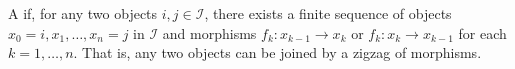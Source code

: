 \begin{definition}
\label{definition:connected_category}
A  if, for any two objects $i, j \in \mathcal{I}$, there exists a finite sequence of objects $x_0 = i, x_1, \dots, x_n = j$ in $\mathcal{I}$ and morphisms $f_k: x_{k-1} \to x_k$ or $f_k: x_k \to x_{k-1}$ for each $k = 1, \dots, n$. That is, any two objects can be joined by a zigzag of morphisms.
\end{definition}